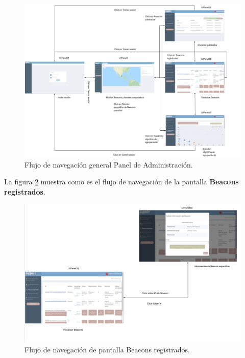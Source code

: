 \FloatBarrier
\begin{figure}[htbp!]
		\centering
			\includegraphics[width=1 \textwidth]{imagenes/paneladminmapa/general4}
		\caption{Flujo de navegación general Panel de Administración.}
		\label{PA:flujo4}
\end{figure}
\FloatBarrier



La figura \ref{PA:flujoBeacons} muestra como es el flujo de navegación de la pantalla \textbf{Beacons registrados}.

\FloatBarrier
\begin{figure}[htbp!]
		\centering
			\includegraphics[width=1 \textwidth]{imagenes/paneladminmapa/beacons3}
		\caption{Flujo de navegación de pantalla Beacons registrados.}
		\label{PA:flujoBeacons}
\end{figure}
\FloatBarrier

